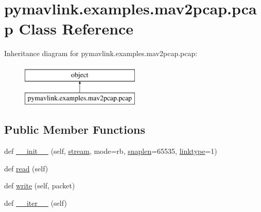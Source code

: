 \hypertarget{classpymavlink_1_1examples_1_1mav2pcap_1_1pcap}{}\section{pymavlink.\+examples.\+mav2pcap.\+pcap Class Reference}
\label{classpymavlink_1_1examples_1_1mav2pcap_1_1pcap}
Inheritance diagram for pymavlink.\+examples.\+mav2pcap.\+pcap\+:\begin{figure}[H]
\begin{center}
\leavevmode
\includegraphics[height=2.000000cm]{classpymavlink_1_1examples_1_1mav2pcap_1_1pcap}
\end{center}
\end{figure}
\subsection*{Public Member Functions}
\begin{DoxyCompactItemize}
\item 
def \mbox{\hyperlink{classpymavlink_1_1examples_1_1mav2pcap_1_1pcap_af7029693ff63df6bbbc019cf023fc287}{\+\_\+\+\_\+init\+\_\+\+\_\+}} (self, \mbox{\hyperlink{classpymavlink_1_1examples_1_1mav2pcap_1_1pcap_a6eb6661b277c5925d2338f6eabd16c69}{stream}}, mode=\textquotesingle{}rb\textquotesingle{}, \mbox{\hyperlink{classpymavlink_1_1examples_1_1mav2pcap_1_1pcap_a38d6c237bd315b0cd4abf138aaf262e1}{snaplen}}=65535, \mbox{\hyperlink{classpymavlink_1_1examples_1_1mav2pcap_1_1pcap_a813b36d754099808dced606c51cbf037}{linktype}}=1)
\item 
def \mbox{\hyperlink{classpymavlink_1_1examples_1_1mav2pcap_1_1pcap_a115443af4c2e19f902a584b67e021ae8}{read}} (self)
\item 
def \mbox{\hyperlink{classpymavlink_1_1examples_1_1mav2pcap_1_1pcap_adfb468dd44dd0a2d50a9357813438a64}{write}} (self, packet)
\item 
def \mbox{\hyperlink{classpymavlink_1_1examples_1_1mav2pcap_1_1pcap_a409fec0dbf2e76e737d5e0b28ffa3f77}{\+\_\+\+\_\+iter\+\_\+\+\_\+}} (self)
\end{DoxyCompactItemize}
